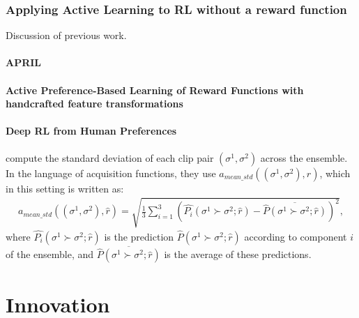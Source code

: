 \documentclass[11pt, a4paper, bibliography=totoc]{report}
\newcommand{\rp}{\hat{r}}
\begin{document}
\section{Applying Active Learning to RL without a reward function}
Discussion of previous work.

\subsection{APRIL}

\subsection{Active Preference-Based Learning of Reward Functions with handcrafted feature transformations}

\subsection{Deep RL from Human Preferences}
\cite{Christiano2017} compute the standard deviation of each clip pair $(\sigma^1, \sigma^2)$ across the ensemble. In the language of acquisition functions, they use $ a_{mean\_std}((\sigma^1, \sigma^2), \rp) $, which in this setting is written as:
\begin{align*}
a_{mean\_std}((\sigma^1, \sigma^2), \rp) = \sqrt{\frac{1}{3}\sum_{i=1}^{3}\left(\hat{P_i}(\sigma^1 \succ \sigma^2  ; \rp) - \overline{\hat{P}(\sigma^1 \succ \sigma^2  ; \rp)}\right)^2},
\end{align*}
where $ \hat{P_i}(\sigma^1 \succ \sigma^2  ; \rp) $ is the prediction $ \hat{P}(\sigma^1 \succ \sigma^2  ; \rp) $ according to component $ i $ of the ensemble, and $ \overline{\hat{P}(\sigma^1 \succ \sigma^2  ; \rp)} $ is the average of these predictions.

\part{Innovation}
\end{document}
